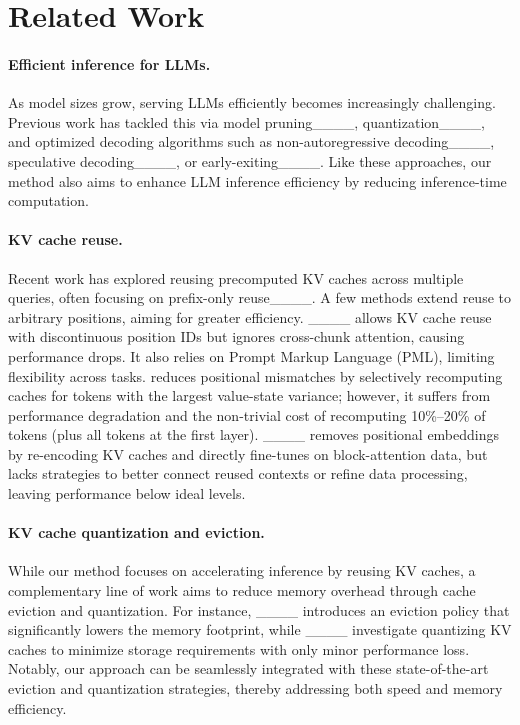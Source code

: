 \section{Related Work}
\paragraph{Efficient inference for LLMs.}
As model sizes grow, serving LLMs efficiently becomes increasingly challenging. Previous work has tackled this via model pruning____, quantization____, and optimized decoding algorithms such as non-autoregressive decoding____, speculative decoding____, or early-exiting____. Like these approaches, our method also aims to enhance LLM inference efficiency by reducing inference-time computation.  

\paragraph{KV cache reuse.}
Recent work has explored reusing precomputed KV caches across multiple queries, often focusing on prefix-only reuse____. A few methods extend reuse to arbitrary positions, aiming for greater efficiency. {\promptcache}____ allows KV cache reuse with discontinuous position IDs but ignores cross-chunk attention, causing performance drops. It also relies on Prompt Markup Language (PML), limiting flexibility across tasks. {\cacheblend} reduces positional mismatches by selectively recomputing caches for tokens with the largest value-state variance; however, it suffers from performance degradation and the non-trivial cost of recomputing 10\%--20\% of tokens (plus all tokens at the first layer). {\blockattn}____ removes positional embeddings by re-encoding KV caches and directly fine-tunes on block-attention data, but lacks strategies to better connect reused contexts or refine data processing, leaving performance below ideal levels.

\paragraph{KV cache quantization and eviction.}
While our method focuses on accelerating inference by reusing KV caches, a complementary line of work aims to reduce memory overhead through cache eviction and quantization. For instance, ____ introduces an eviction policy that significantly lowers the memory footprint, while ____ investigate quantizing KV caches to minimize storage requirements with only minor performance loss. Notably, our approach can be seamlessly integrated with these state-of-the-art eviction and quantization strategies, thereby addressing both speed and memory efficiency.